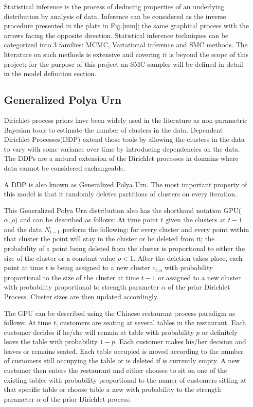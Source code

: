 \documentclass[twoside,hidelinks]{article}
\begin{document}
Statistical inference is the process of deducing properties of an underlying distribution by analysis of data. Inference can be considered as the inverse procedure presented in the plate in Fig.\ref{mm}; the same graphical process with the arrows facing the opposite direction. Statistical inference techniques can be categorized into 3 families: MCMC, Variational inference and SMC methods. The literature on such methods is extensive and covering it is beyond the scope of this project; for the purpose of this project an SMC sampler will be defined in detail in the model definition section. 

\subsection{Generalized Polya Urn}


Dirichlet process priors have been widely used in the literature as non-parametric Bayesian tools to estimate the number of clusters in the data\cite{antoniak}. Dependent Dirichlet Processes(DDP) extend those tools by allowing the clusters in the data to vary with some variance over time by introducing dependencies on the data. The DDPs are a natural extension of the Dirichlet processes in domains where data cannot be considered exchangeable. 

A DDP is also known as Generalized Polya Urn\cite{caron}. The most important property of this model is that it randomly deletes partitions of clusters on every iteration. 


This Generalized Polya Urn distribution also has the shorthand notation GPU($\alpha,\rho$) and can be described as follows: At time point $t$ given the clusters at $t-1$ and the data $N_{t-1}$ perform the following: for every cluster and every point within that cluster the point will stay in the cluster or be deleted from it; the probability of a point being deleted from the cluster is proportional to either the size of the cluster or a constant value $\rho <1$\cite{caron}. After the deletion takes place, each point at time $t$ is being assigned to a new cluster $c_{t,n}$  with probability proportional to the size of the cluster at time $t-1$ or assigned to a new cluster with probability proportional to strength parameter $\alpha$ of the prior Dirichlet Process. Cluster sizes are then updated accordingly.


The GPU can be described using the Chinese restaurant process paradigm as follows: At time $t$, customers are seating at several tables in the restaurant. Each customer decides if he/she will remain at table with probability $p$ or definitely leave the table with probability $1-p$. Each customer makes his/her decision and leaves or remains seated. Each table occupied is moved according to the number of customers still occupying the table or is deleted if is currently empty. A new customer then enters the restaurant and either chooses to sit on one of the existing tables with probability proportional to the numer of customers sitting at that specific table or choose table a new with probability to the strength parameter $\alpha$ of the prior Dirichlet process.
\end{document}

